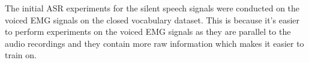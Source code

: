 The initial ASR experiments for the silent speech signals were conducted on the voiced EMG signals
on the closed vocabulary dataset. This is because it's easier to perform experiments on the voiced
EMG signals as they are parallel to the audio recordings and they contain more raw information
which makes it easier to train on.